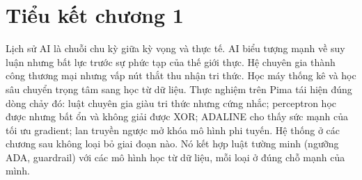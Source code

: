 \section{Tiểu kết chương 1}

Lịch sử AI là chuỗi chu kỳ giữa kỳ vọng và thực tế. AI biểu tượng mạnh về suy luận nhưng bất lực trước sự phức tạp của thế giới thực. Hệ chuyên gia thành công thương mại nhưng vấp nút thắt thu nhận tri thức. Học máy thống kê và học sâu chuyển trọng tâm sang học từ dữ liệu. Thực nghiệm trên Pima tái hiện đúng dòng chảy đó: luật chuyên gia giàu tri thức nhưng cứng nhắc; perceptron học được nhưng bất ổn và không giải được XOR; ADALINE cho thấy sức mạnh của tối ưu gradient; lan truyền ngược mở khóa mô hình phi tuyến. Hệ thống ở các chương sau không loại bỏ giai đoạn nào. Nó kết hợp luật tường minh (ngưỡng ADA, guardrail) với các mô hình học từ dữ liệu, mỗi loại ở đúng chỗ mạnh của mình.
